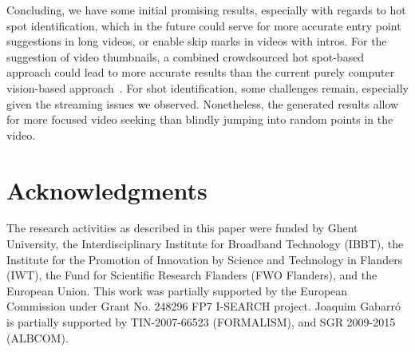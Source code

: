 \documentclass{acm_proc_article-sp}
\begin{document}
Concluding, we have some initial promising results, especially with regards to hot spot identification, which in the future could serve for more accurate entry point suggestions in long videos, or enable skip marks in videos with intros. For the suggestion of video thumbnails, a combined crowdsourced hot spot-based approach could lead to more accurate results than the current purely computer vision-based approach~\cite{googleresearch}. For shot identification, some challenges remain, especially given the streaming issues we observed. Nonetheless, the generated results allow for more focused video seeking than blindly jumping into random points in the video.

\section*{Acknowledgments}
The research activities as described in this paper were funded by Ghent University, the Interdisciplinary Institute for Broadband Technology (IBBT), the Institute for the Promotion of Innovation by Science and Technology in Flanders (IWT), the Fund for Scientific Research Flanders (FWO Flanders), and the European Union.
This work was partially supported by the European Commission under Grant No. 248296 FP7 \mbox{I-SEARCH} project.
Joaquim Gabarr\'o is partially supported by TIN-2007-66523 (FORMALISM), and SGR 2009-2015 (\mbox{ALBCOM}).




\balancecolumns
\end{document}
